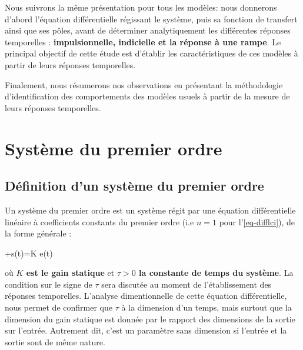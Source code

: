 Nous suivrons la même présentation pour tous les modèles: 
nous donnerons d'abord l'équation différentielle régissant le système, puis 
sa fonction de transfert ainsi que ses pôles, avant de 
déterminer analytiquement les différentes réponses temporelles : 
\textbf{impulsionnelle, indicielle et la réponse à une rampe}. 
Le principal objectif de cette étude est d'établir les caractéristiques 
de ces modèles à partir de leurs réponses temporelles.

Finalement, nous résumerons nos observations en présentant la méthodologie  
d'identification des comportements des modèles usuels à partir de la mesure
de leurs réponses temporelles.     
\section{Système du premier ordre}
\subsection{Définition d'un système du premier ordre}
Un système du premier ordre est un système régit par une équation
différentielle linéaire à coefficients constants du premier ordre 
(i.e $n=1$ pour l'\cref{eq-difflci}), de la forme générale :
\begin{bequation}
    \tau{}+s(t)=K e(t)\label{eq-1er}
\end{bequation}
où \textbf{$K$ est le gain statique} et \textbf{$\tau>0$ la constante de 
temps du système}. La condition sur le signe de $\tau$ sera 
discutée au moment de l'établissement des réponses temporelles.
L'analyse dimentionnelle de cette équation différentielle, nous permet 
de confirmer que $\tau$ à la dimension d'un temps, mais surtout que 
la dimension du gain statique est donnée par le rapport des dimensions de 
la sortie sur l'entrée. Autrement dit, c'est un paramètre sans dimension 
si l'entrée et la sortie sont de même nature.
\newpage
{}
\captionsetup{width=0.9\linewidth}
